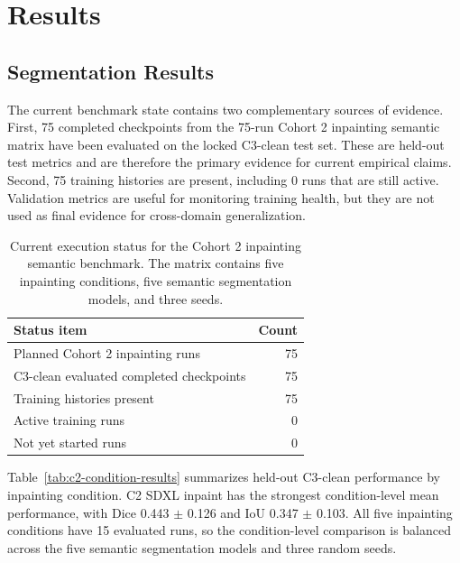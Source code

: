 \section{Results}

\subsection{Segmentation Results}

The current benchmark state contains two complementary sources of evidence. First, 75 completed checkpoints from the 75-run Cohort 2 inpainting semantic matrix have been evaluated on the locked C3-clean test set. These are held-out test metrics and are therefore the primary evidence for current empirical claims. Second, 75 training histories are present, including 0 runs that are still active. Validation metrics are useful for monitoring training health, but they are not used as final evidence for cross-domain generalization.

\begin{table}[H]
  \centering
  \caption{Current execution status for the Cohort 2 inpainting semantic benchmark. The matrix contains five inpainting conditions, five semantic segmentation models, and three seeds.}
  \label{tab:current-status}
  \begin{tabular}{lr}
    \toprule
    \textbf{Status item} & \textbf{Count} \\
    \midrule
    Planned Cohort 2 inpainting runs & 75 \\
    C3-clean evaluated completed checkpoints & 75 \\
    Training histories present & 75 \\
    Active training runs & 0 \\
    Not yet started runs & 0 \\
    \bottomrule
  \end{tabular}
\end{table}

Table~\ref{tab:c2-condition-results} summarizes held-out C3-clean performance by inpainting condition. C2 SDXL inpaint has the strongest condition-level mean performance, with Dice 0.443 $\pm$ 0.126 and IoU 0.347 $\pm$ 0.103. All five inpainting conditions have 15 evaluated runs, so the condition-level comparison is balanced across the five semantic segmentation models and three random seeds.

